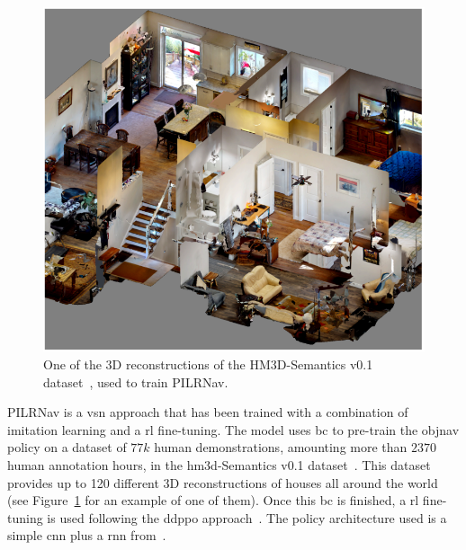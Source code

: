 \begin{figure}[t]
    \centering
    \includegraphics[width=\linewidth]{figures/ros4vsn/dataset_scene}
    \caption{One of the 3D reconstructions of the HM3D-Semantics v0.1 dataset~\cite{Ramakrishnan2021HabitatMatterport3D}, used to train PILRNav.}
    \label{fig:scene_hm3d}
\end{figure}

PILRNav is a \acrshort{vsn} approach that has been trained with a combination of imitation learning and a \acrshort{rl} fine-tuning.
The model uses \acrfull{bc} to pre-train the \acrshort{objnav} policy on a dataset of $77k$ human demonstrations, amounting more than $2370$ human annotation hours, in the \acrshort{hm3d}-Semantics v0.1 dataset~\cite{Ramakrishnan2021HabitatMatterport3D}.
This dataset provides up to 120 different 3D reconstructions of houses all around the world (see Figure~\ref{fig:scene_hm3d} for an example of one of them).
Once this \acrshort{bc} is finished, a \acrshort{rl} fine-tuning is used following the \acrshort{ddppo} approach~\cite{Wijmans2019DDPPOLN}.
The policy architecture used is a simple \acrshort{cnn} plus a \acrshort{rnn} from~\cite{yadav2022}.

